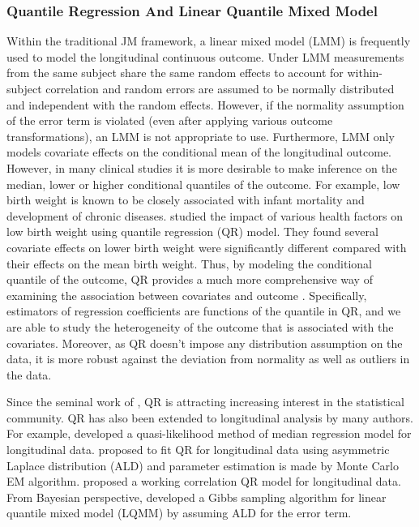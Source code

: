 \subsubsection{Quantile Regression And Linear Quantile Mixed Model}\label{sec:bak_qr}
Within the traditional JM framework, a linear mixed model (LMM) is frequently used to model the longitudinal continuous outcome. Under LMM measurements from the same subject share the same random effects to account for within-subject correlation and random errors are assumed to be normally distributed and independent with the random effects\citep{laird1982random}. However, if the normality assumption of the error term is violated (even after applying various outcome transformations), an LMM is not appropriate to use. Furthermore, LMM  only models covariate effects on the conditional mean of the longitudinal outcome. However, in many clinical studies it is more desirable to make inference on the median, lower or higher conditional quantiles of the outcome. For example, low birth weight is known to be closely associated with infant mortality and development of chronic diseases. \cite{koenker2001quantile} studied the impact of various health factors on low birth weight using quantile regression (QR) model. They found several covariate effects on lower birth weight were significantly different compared with their effects on the mean birth weight. Thus, by modeling the conditional quantile of the outcome, QR provides a much more comprehensive way of examining the association between covariates and outcome \citep{koenker2005quantile}. Specifically, estimators of regression coefficients are functions of the quantile in QR, and we are able to study the heterogeneity of the outcome that is associated with the covariates. Moreover, as QR doesn't impose any distribution assumption on the data, it is more robust against the deviation from normality as well as outliers in the data.

Since the seminal work of \cite{koenker1978regression}, QR is attracting increasing interest in the statistical community. QR has also been extended to longitudinal analysis by many authors. For example, \cite{jung1996quasi} developed a quasi-likelihood method of median regression model for longitudinal data. \cite{geraci2007quantile} proposed to fit QR for longitudinal data using asymmetric Laplace distribution (ALD) and parameter estimation is made by Monte Carlo EM algorithm. \cite{fu2012quantile} proposed a working correlation QR model for longitudinal data. From Bayesian perspective, \citep{kozumi2011gibbs, luo2012bayesian} developed a Gibbs sampling algorithm for linear quantile mixed model (LQMM) by assuming ALD for the error term.





